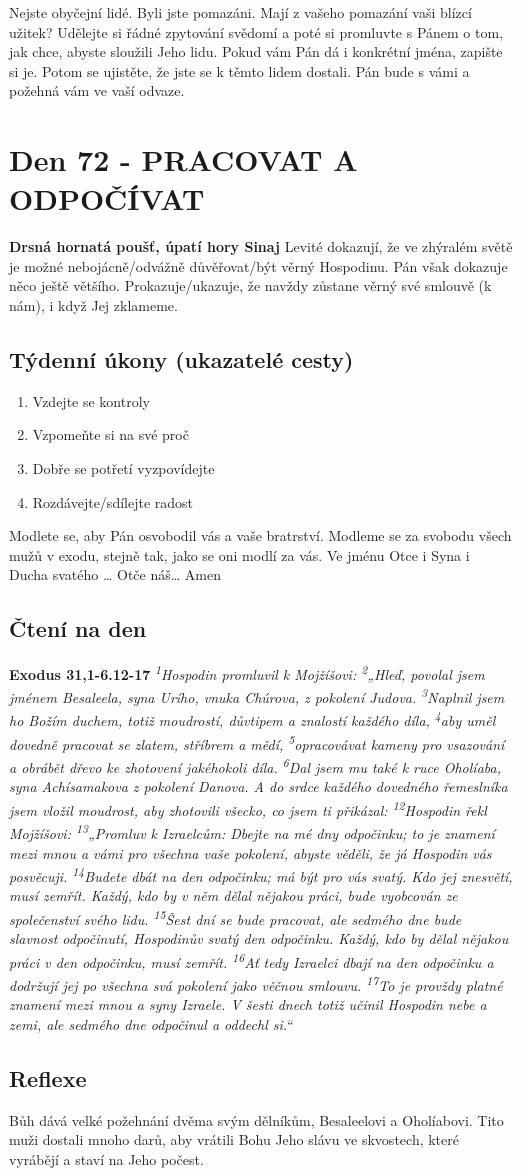 \documentclass[11pt]{article}
\newcommand{\zacatekJedenactyTyden}{
\textbf{Drsná hornatá poušť, úpatí hory Sinaj} \newline 
Levité dokazují, že ve zhýralém světě je možné nebojácně/odvážně důvěřovat/být věrný Hospodinu. Pán však dokazuje něco ještě většího. Prokazuje/ukazuje, že navždy zůstane věrný své smlouvě (k nám), i když Jej zklameme.

\subsection*{Týdenní úkony (ukazatelé cesty)}
\begin{enumerate}
  \item Vzdejte se kontroly
  \item Vzpomeňte si na své proč
  \item Dobře se potřetí vyzpovídejte
  \item Rozdávejte/sdílejte radost
\end{enumerate}
Modlete se, aby Pán osvobodil vás a vaše bratrství. \newline
Modleme se za svobodu všech mužů v exodu, stejně tak, jako se oni modlí za vás.\newline
Ve jménu Otce i Syna i Ducha svatého …  Otče náš… Amen
}
\begin{document}
Nejste obyčejní lidé. Byli jste pomazáni. Mají z vašeho pomazání vaši blízcí užitek? Udělejte si řádné zpytování
svědomí a poté si promluvte s Pánem o tom, jak chce, abyste sloužili Jeho lidu. Pokud vám Pán dá i konkrétní jména,
zapište si je. Potom se ujistěte, že jste se k těmto lidem dostali. Pán bude s vámi a požehná vám ve vaší odvaze.


\newpage
\section{Den 72 - PRACOVAT A ODPOČÍVAT}
\zacatekJedenactyTyden
\subsection*{Čtení na den}
\textbf{Exodus 31,1-6.12-17}
\newline
\textit{
\textsuperscript{1}Hospodin promluvil k Mojžíšovi:
\textsuperscript{2}„Hleď, povolal jsem jménem Besaleela, syna Urího, vnuka Chúrova, z pokolení Judova.
\textsuperscript{3}Naplnil jsem ho Božím duchem, totiž moudrostí, důvtipem a znalostí každého díla,
\textsuperscript{4}aby uměl dovedně pracovat se zlatem, stříbrem a mědí,
\textsuperscript{5}opracovávat kameny pro vsazování a obrábět dřevo ke zhotovení jakéhokoli díla.
\textsuperscript{6}Dal jsem mu také k ruce Oholíaba, syna Achísamakova z pokolení Danova. A do srdce každého dovedného řemeslníka jsem vložil moudrost, aby zhotovili všecko, co jsem ti přikázal:
\newline
\newline
\textsuperscript{12}Hospodin řekl Mojžíšovi:
\textsuperscript{13}„Promluv k Izraelcům: Dbejte na mé dny odpočinku; to je znamení mezi mnou a vámi pro všechna vaše pokolení, abyste věděli, že já Hospodin vás posvěcuji.
\textsuperscript{14}Budete dbát na den odpočinku; má být pro vás svatý. Kdo jej znesvětí, musí zemřít. Každý, kdo by v něm dělal nějakou práci, bude vyobcován ze společenství svého lidu.
\textsuperscript{15}Šest dní se bude pracovat, ale sedmého dne bude slavnost odpočinutí, Hospodinův svatý den odpočinku. Každý, kdo by dělal nějakou práci v den odpočinku, musí zemřít.
\textsuperscript{16}Ať tedy Izraelci dbají na den odpočinku a dodržují jej po všechna svá pokolení jako věčnou smlouvu.
\textsuperscript{17}To je provždy platné znamení mezi mnou a syny Izraele. V šesti dnech totiž učinil Hospodin nebe a zemi, ale sedmého dne odpočinul a oddechl si.“
}

\subsection*{Reflexe}
Bůh dává velké požehnání dvěma svým dělníkům, Besaleelovi a Oholíabovi. Tito muži dostali mnoho darů, aby vrátili
Bohu Jeho slávu ve skvostech, které vyrábějí a staví na Jeho počest.
\end{document}
